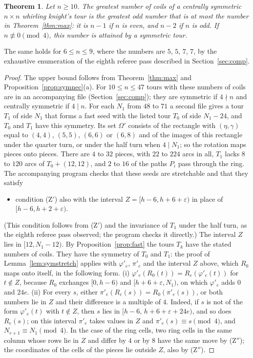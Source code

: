 \documentclass[11pt]{amsart}
\newtheorem{theorem}{Theorem}
\theoremstyle{remark}
\begin{document}
\begin{theorem}\label{thm:symmax}
Let $n\ge10$. The greatest number of coils of a centrally symmetric $n\times n$ whirling knight's tour is the greatest
odd number that is at most the number in Theorem~\ref{thm:max}: it is $n-1$ if $n$ is even, and $n-2$ if $n$ is odd.
If $n\not\equiv0\pmod 4$, this number is attained by a symmetric tour.
\end{theorem}
The same holds for $6\le n\le9$, where the numbers are $5$, $5$, $7$, $7$, by the exhaustive enumeration of the
eighth referee pass described in Section~\ref{sec:comp}.
\begin{proof}
The upper bound follows from Theorem~\ref{thm:max} and Proposition~\ref{prop:symnec}(a). For $10\le n\le47$ tours
with these numbers of coils are in an accompanying file (Section~\ref{sec:comp}); they are symmetric if $4\nmid n$
and centrally symmetric if $4\mid n$. For each $N_1$ from $48$ to $71$ a second file gives a tour $T_1$ of side $N_1$
that forms a fast seed with the listed tour $T_0$ of side $N_1-24$, and $T_0$ and $T_1$ have this symmetry. Its set $\Omega'$ consists of the rectangle with $(\eta,\gamma)$ equal to $(4,4)$, $(5,5)$, $(6,6)$ or
$(6,8)$ and of the images of this rectangle under the quarter turn, or under the half turn when $4\mid N_1$; so the
rotation maps pieces onto pieces. There are $4$ to $32$ pieces, with $22$ to $224$ arcs in all, $T_1$ lacks $8$ to
$120$ arcs of $T_0+(12,12)$, and $2$ to $16$ of the paths $P_i$ pass through the ring.
The accompanying program checks that these seeds are stretchable and that they satisfy
\begin{itemize}
\item[(Z$''$)] condition (Z$'$) also with the interval $Z=[h-6,h+6+\varepsilon)$ in place of
$[h-6,h+2+\varepsilon)$.
\end{itemize}
(This condition follows from (Z$'$) and the invariance of $T_1$ under the half turn, as the eighth referee pass
observed; the program checks it directly.) The interval $Z$ lies in $[12,N_1-12)$.
By Proposition~\ref{prop:fast} the tours $T_k$ have the stated numbers of coils. They have the symmetry of $T_0$
and $T_1$: the proof of Lemma~\ref{lem:symstretch} applies with $\varphi'_e$, $\pi'_e$ and the interval $Z$ above,
which $R_0$ maps onto itself, in the following form. (i) $\varphi'_e(R_0(t))=R_e(\varphi'_e(t))$ for $t\notin Z$,
because $R_0$ exchanges $[0,h-6)$ and $[h+6+\varepsilon,N_1)$, on which $\varphi'_e$ adds $0$ and $24e$. (ii) For
every $s$, either $\pi'_e(R_e(s))=R_0(\pi'_e(s))$, or both numbers lie in $Z$ and their difference is a multiple of
$4$. Indeed, if $s$ is not of the form $\varphi'_e(t)$ with $t\notin Z$, then $s$ lies in
$[h-6,\,h+6+\varepsilon+24e)$, and so does $R_e(s)$; on this interval $\pi'_e$ takes values in $Z$ and
$\pi'_e(s)\equiv s\pmod 4$, and $N_{e+1}\equiv N_1\pmod 4$. In the case of the ring cells, two ring cells in the
same column whose rows lie in $Z$ and differ by $4$ or by $8$ have the same move by (Z$''$); the coordinates of
the cells of the pieces lie outside $Z$, also by (Z$''$).
\end{proof}
\end{document}
